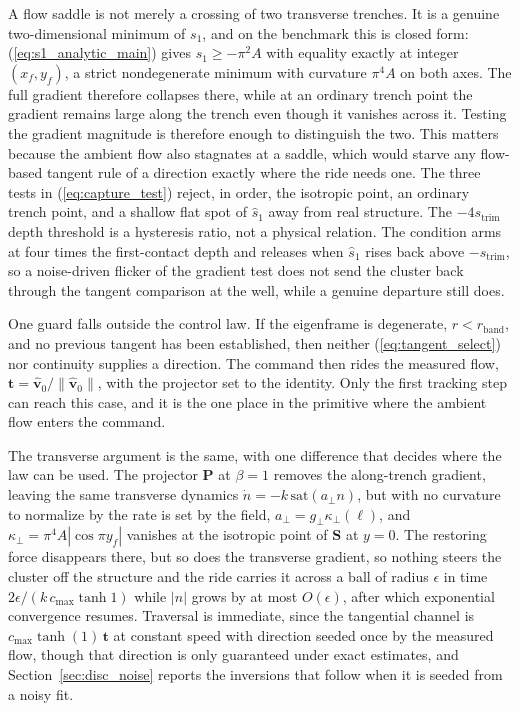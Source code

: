 \documentclass[lettersize,journal]{IEEEtran}
\begin{document}
A flow saddle is not merely a crossing of two transverse trenches. It is
a genuine two-dimensional minimum of $s_1$, and on the benchmark this
is closed form: (\ref{eq:s1_analytic_main}) gives
$s_1 \geq -\pi^2 A$ with equality exactly at integer $(x_f, y_f)$, a
strict nondegenerate minimum with curvature $\pi^4 A$ on both axes. The
full gradient therefore collapses there, while at an
ordinary trench point the gradient remains large along the trench even
though it vanishes across it. Testing the gradient magnitude is
therefore enough to distinguish the two. This matters because the
ambient flow also stagnates at a saddle, which would starve any
flow-based tangent rule of a direction exactly where the ride needs one.
The three tests in (\ref{eq:capture_test}) reject, in order, the
isotropic point, an ordinary trench point, and a shallow flat spot of
$\hat{s}_1$ away from real structure. The $-4s_{\mathrm{trim}}$ depth
threshold is a hysteresis ratio, not a physical relation. The
condition arms at four times the first-contact depth and releases when
$\hat{s}_1$ rises back above $-s_{\mathrm{trim}}$, so a noise-driven
flicker of the gradient test does not send the cluster back through the
tangent comparison at the well, while a genuine departure still does.

One guard falls outside the control law. If the eigenframe is
degenerate, $r < r_{\mathrm{band}}$, and no previous tangent has been
established, then neither (\ref{eq:tangent_select}) nor continuity
supplies a direction. The command then rides the measured flow,
$\mathbf{t} = \hat{\mathbf{v}}_0/\|\hat{\mathbf{v}}_0\|$, with the
projector set to the identity. Only the first tracking step can reach
this case, and it is the one place in the primitive where the ambient
flow enters the command.

The transverse argument is the same, with one difference that decides
where the law can be used. The projector $\mathbf{P}$ at $\beta = 1$
removes the along-trench gradient, leaving the same transverse dynamics
$\dot{n} = -k\,\mathrm{sat}(a_\perp n)$, but with no curvature to
normalize by the rate is set by the field, $a_\perp = g_\perp
\kappa_\perp(\ell)$, and $\kappa_\perp = \pi^4 A|\cos \pi y_f|$ vanishes
at the isotropic point of $\mathbf{S}$ at $y = 0$. The restoring force
disappears there, but so does the transverse gradient, so nothing steers
the cluster off the structure and the ride carries it across a ball of
radius $\epsilon$ in time $2\epsilon/(k\,c_{\max}\tanh 1)$ while $|n|$
grows by at most $O(\epsilon)$, after which exponential convergence
resumes. Traversal is immediate, since the tangential channel is
$c_{\max}\tanh(1)\,\mathbf{t}$ at constant speed with direction seeded
once by the measured flow, though that direction is only guaranteed
under exact estimates, and Section~\ref{sec:disc_noise} reports the
inversions that follow when it is seeded from a noisy fit.
\end{document}
